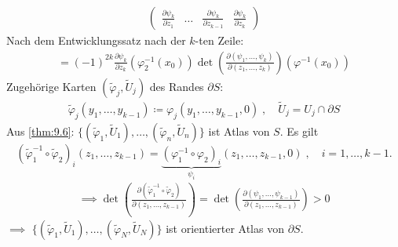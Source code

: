 \documentclass[a4paper,10pt]{scrbook}
\begin{document}
\begin{theorem}[Definition]
\begin{align*}
\begin{pmatrix}
    \frac{\partial \psi_k}{\partial z_1} & \ldots & \frac{\partial \psi_k}{\partial z_{k-1}} & \frac{\partial \psi_k}{\partial z_k}
    \end{pmatrix}
  \end{align*}
  Nach dem Entwicklungssatz nach der $k$-ten Zeile:
  \begin{align*}
    = (-1)^{2k} \frac{\partial \psi_k}{\partial z_k} \left(\varphi_2^{-1}(x_0)\right) \det\left(\frac{\partial (\psi_1,\ldots,\psi_k)}{\partial (z_1,\ldots,z_k)}\right) \left(\varphi^{-1}(x_0)\right)
  \end{align*}
  Zugehörige Karten $(\widetilde{\varphi}_j,\widetilde{U}_j)$ des Randes $\partial S$:
  \begin{align*}
    \widetilde{\varphi}_j(y_1,\ldots,y_{k-1}) \coloneq \varphi_j(y_1,\ldots,y_{k-1},0) \; , \quad \widetilde{U}_j = U_j \cap \partial S
  \end{align*}
  Aus \ref{thm:9.6}: $\{ (\widetilde{\varphi}_1,\widetilde{U}_1),\ldots,(\widetilde{\varphi}_n,\widetilde{U}_n) \}$ ist Atlas von $S$. Es gilt \[(\widetilde{\varphi}_1^{-1} \circ \widetilde{\varphi}_2)_i(z_1,\ldots,z_{k-1}) = \underbrace{(\varphi_1^{-1} \circ \varphi_2)_i}_{\psi_i}(z_1,\ldots,z_{k-1},0) \; , \quad i = 1,\ldots,k-1.\]
  \begin{align*}
    \implies \det \left( \frac{\partial (\widetilde{\varphi}_1^{-1} \circ \widetilde{\varphi}_2)}{\partial (z_1,\ldots,z_{k-1})} \right) = \det \left( \frac{\partial (\psi_1,\ldots,\psi_{k-1})}{\partial (z_1,\ldots,z_{k-1})} \right) > 0
  \end{align*}
  $\implies$ $\{ (\widetilde{\varphi}_1,\widetilde{U}_1),\ldots,(\widetilde{\varphi}_N,\widetilde{U}_N) \}$ ist orientierter Atlas von $\partial S$.
\end{theorem}
\end{document}
